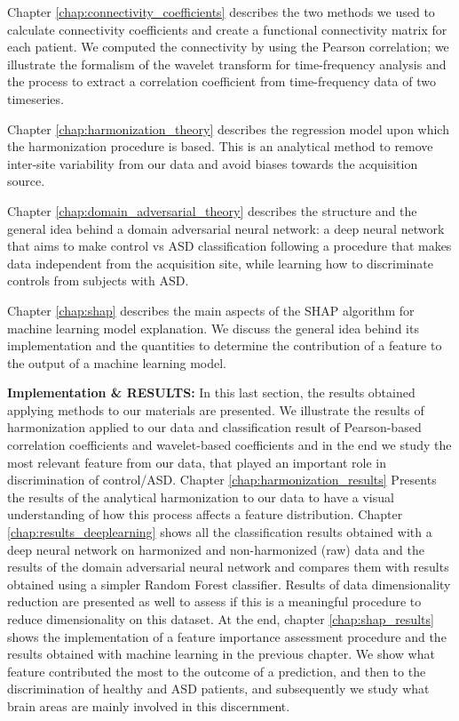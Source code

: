 \documentclass[11pt]{report}
\begin{document}
Chapter \ref{chap:connectivity_coefficients} describes the two methods we used to calculate connectivity coefficients and create a functional connectivity matrix for each patient. We computed the connectivity by using the Pearson correlation; we illustrate the formalism of the wavelet transform for time-frequency analysis and the process to extract a correlation coefficient from time-frequency data of two timeseries.

Chapter \ref{chap:harmonization_theory} describes the regression model upon which the harmonization procedure is based. This is an analytical method to remove inter-site variability from our data and avoid biases towards the acquisition source.

Chapter \ref{chap:domain_adversarial_theory} describes the structure and the general idea behind a domain adversarial neural network: a deep neural network that aims
to make control vs ASD classification following a procedure that makes data independent from the acquisition site, while learning how to discriminate controls from subjects with ASD.

Chapter \ref{chap:shap} describes the main aspects of the SHAP algorithm for machine learning model explanation. We discuss the general idea behind its implementation and the quantities to determine the contribution of a feature to the output of a machine learning model.

\textbf{Implementation \& RESULTS:} In this last section, the results obtained applying methods to our materials are presented. We illustrate the results of harmonization applied to our data and classification result of Pearson-based correlation coefficients and wavelet-based coefficients and in the end we study the most relevant feature from our data, that played an important role in discrimination of control/ASD.
Chapter \ref{chap:harmonization_results} Presents the results of the analytical harmonization to our data to have a visual understanding of how this process affects a feature distribution.
Chapter \ref{chap:results_deeplearning} shows all the classification results obtained with a deep neural network on harmonized and non-harmonized (raw) data and the results of the domain adversarial neural network and compares them with results obtained using a simpler Random Forest classifier. Results of data dimensionality reduction are presented as well to assess if this is a meaningful procedure to reduce dimensionality on this dataset.
At the end, chapter \ref{chap:shap_results} shows the implementation of a feature importance assessment procedure and the results obtained with machine learning in the previous chapter. We show what feature contributed the most to the outcome of a prediction, and then to the discrimination of healthy and ASD patients, and subsequently we study what brain areas are mainly involved in this discernment.
\end{document}
